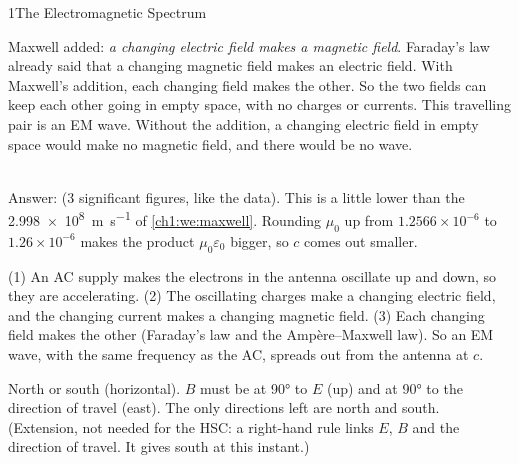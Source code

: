 \begin{chapteranswers}{1}{The Electromagnetic Spectrum}

\item Maxwell added: \emph{a changing electric field makes a magnetic field}. Faraday's law
  already said that a changing magnetic field makes an electric field. With Maxwell's addition,
  each changing field makes the other. So the two fields can keep each other going in empty
  space, with no charges or currents. This travelling pair is an EM wave. Without the addition,
  a changing electric field in empty space would make no magnetic field, and there would be no
  wave.

\item {}\\
  Answer:  (3 significant figures, like the data). This is a
  little lower than the \qty{2.998e8}{m.s^{-1}} of \cref{ch1:we:maxwell}. Rounding $\mu_0$ up
  from $1.2566\times10^{-6}$ to $1.26\times10^{-6}$ makes the product $\mu_0\varepsilon_0$
  bigger, so $c$ comes out smaller.

\item (1) An AC supply makes the electrons in the antenna oscillate up and down, so they are
  accelerating. (2) The oscillating charges make a changing electric field, and the changing
  current makes a changing magnetic field. (3) Each changing field makes the other (Faraday's law
  and the Ampère--Maxwell law). So an EM wave, with the same frequency as the AC, spreads out from
  the antenna at $c$.

\item North or south (horizontal). $B$ must be at \ang{90} to $E$ (up) and at \ang{90} to the
  direction of travel (east). The only directions left are north and south. (Extension, not
  needed for the HSC: a right-hand rule links $E$, $B$ and the direction of travel. It gives
  south at this instant.)


\end{chapteranswers}
